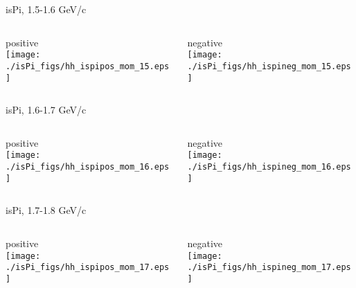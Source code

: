 \documentclass[compress]{beamer} %
\begin{document}

\begin{frame}{isPi, 1.5-1.6 GeV/c}
\begin{columns}
\begin{column}{.5\linewidth}
positive \\
\texttt{[image: ./isPi\_figs/hh\_ispipos\_mom\_15.eps]} \\
\end{column}
\begin{column}{.5\linewidth}
negative \\
\texttt{[image: ./isPi\_figs/hh\_ispineg\_mom\_15.eps]} \\
\end{column}
\end{columns}
\end{frame}


\begin{frame}{isPi, 1.6-1.7 GeV/c}
\begin{columns}
\begin{column}{.5\linewidth}
positive \\
\texttt{[image: ./isPi\_figs/hh\_ispipos\_mom\_16.eps]} \\
\end{column}
\begin{column}{.5\linewidth}
negative \\
\texttt{[image: ./isPi\_figs/hh\_ispineg\_mom\_16.eps]} \\
\end{column}
\end{columns}
\end{frame}


\begin{frame}{isPi, 1.7-1.8 GeV/c}
\begin{columns}
\begin{column}{.5\linewidth}
positive \\
\texttt{[image: ./isPi\_figs/hh\_ispipos\_mom\_17.eps]} \\
\end{column}
\begin{column}{.5\linewidth}
negative \\
\texttt{[image: ./isPi\_figs/hh\_ispineg\_mom\_17.eps]} \\
\end{column}
\end{columns}
\end{frame}
\end{document}

